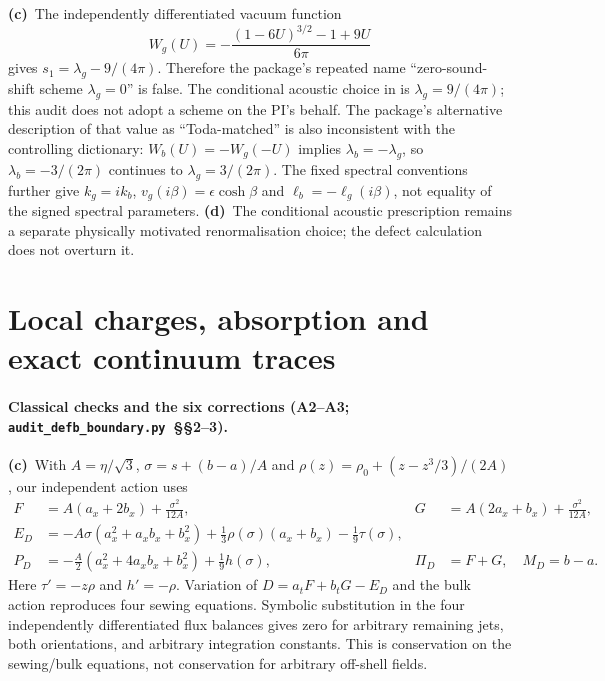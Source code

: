\documentclass[11pt,a4paper]{article}
\newcommand{\Lc}{\textbf{(c)}\ }
\newcommand{\Ld}{\textbf{(d)}\ }
\newcommand{\scr}{\texttt{audit\_\allowbreak defb\_\allowbreak boundary.py}}
\newcommand{\file}[1]{\texttt{\detokenize{#1}}}
\begin{document}
\Lc The independently differentiated vacuum function
\begin{equation}
 W_g(U)=-\frac{(1-6U)^{3/2}-1+9U}{6\pi}
\end{equation}
gives $s_1=\lambda_g-9/(4\pi)$. Therefore the package's repeated name
``zero-sound-shift scheme $\lambda_g=0$'' is false. The conditional acoustic
choice in \file{good_renorm.tex} is $\lambda_g=9/(4\pi)$; this audit does
not adopt a scheme on the PI's behalf. The package's alternative description
of that value as ``Toda-matched'' is also inconsistent with the controlling
dictionary: $W_b(U)=-W_g(-U)$ implies $\lambda_b=-\lambda_g$, so
$\lambda_b=-3/(2\pi)$ continues to $\lambda_g=3/(2\pi)$.
The fixed spectral conventions further give $k_g=ik_b$,
$v_g(i\beta)=\epsilon\cosh\beta$ and
$\ell_b=-\ell_g(i\beta)$, not equality of the signed spectral parameters.
\Ld The conditional acoustic prescription remains a separate physically
motivated renormalisation choice; the defect calculation does not overturn it.

\section{Local charges, absorption and exact continuum traces}
\paragraph{Classical checks and the six corrections (A2--A3; \scr\ §§2--3).}
\Lc With $A=\eta/\sqrt3$, $\sigma=s+(b-a)/A$ and
$\rho(z)=\rho_0+(z-z^3/3)/(2A)$, our independent action uses
\begin{align}
 F&=A(a_x+2b_x)+\frac{\sigma^2}{12A},&
 G&=A(2a_x+b_x)+\frac{\sigma^2}{12A},\\
 E_D&=-A\sigma(a_x^2+a_xb_x+b_x^2)
           +\tfrac13\rho(\sigma)(a_x+b_x)-\tfrac19\tau(\sigma),\\
 P_D&=-\tfrac A2(a_x^2+4a_xb_x+b_x^2)+\tfrac19h(\sigma),&
 \Pi_D&=F+G,\quad M_D=b-a.
\end{align}
Here $\tau'=-z\rho$ and $h'=-\rho$. Variation of $D=a_tF+b_tG-E_D$
and the bulk action reproduces four sewing equations. Symbolic substitution
in the four independently differentiated flux balances gives zero for
arbitrary remaining jets, both orientations, and arbitrary integration
constants. This is conservation on the sewing/bulk equations, not conservation
for arbitrary off-shell fields.
\end{document}
